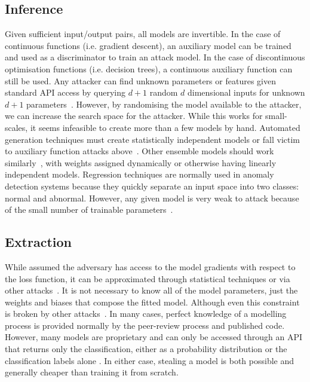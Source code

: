 \subsection{Inference}
\label{subsec:inference_attacks}
Given sufficient input/output pairs, all models are invertible. In the case of continuous functions (i.e. gradient descent), an auxiliary model can be trained and used as a discriminator to train an attack model. In the case of discontinuous optimisation functions (i.e. decision trees), a continuous auxiliary function can still be used. Any attacker can find unknown parameters or features given standard API access by querying $d+1$ random $d$ dimensional inputs for unknown $d+1$ parameters~\cite{chakraborty_adversarial_2018}. However, by randomising the model available to the attacker, we can increase the search space for the attacker. While this works for small-scales, it seems infeasible to create more than a few models by hand. Automated generation techniques must create statistically independent models or fall victim to auxiliary function attacks above~\cite{gauss_aug}. Other ensemble models should work similarly~\cite{gauss_out}, with weights assigned dynamically or otherwise having linearly independent models. Regression techniques are normally used in anomaly detection systems because they quickly separate an input space into two classes: normal and abnormal. However, any given model is very weak to attack because of the small number of trainable parameters~\cite{chakraborty_adversarial_2018}.


\subsection{Extraction}
\label{subsec:extraction_attacks}
While assumed the adversary has access to the model gradients with respect to the loss function, it can be approximated through statistical techniques or via other attacks~\cite{wang2019security,chakraborty2018adversarial}. It is not necessary to know all of the model parameters, just the weights and biases that compose the fitted model. Although even this constraint is broken by other attacks~\cite{wang2019security,chakraborty2018adversarial}. In many cases, perfect knowledge of a modelling process is provided normally by the peer-review process and published code. However, many models are proprietary and can only be accessed through an API that returns only the classification, either as a probability distribution or the classification labels alone \cite{tramer2016stealing}. In either case, stealing a model is both possible and generally cheaper than training it from scratch.

